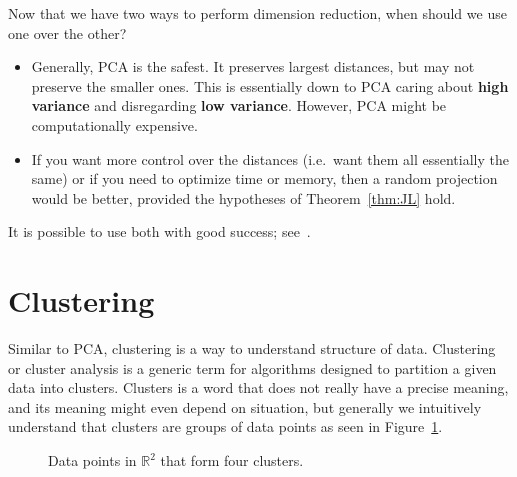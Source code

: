 \documentclass[a4paper, 12pt]{article}
\numberwithin{equation}{section}
\numberwithin{figure}{section}
\theoremstyle{definition}
\newcommand{\R}{\mathbb{R}}
\begin{document}
Now that we have two ways to perform dimension reduction, when should we use one
over the other?
\begin{itemize}
	\item Generally, PCA is the safest. It preserves largest distances, but may
	not preserve the smaller ones. This is essentially down to PCA caring about
	\textbf{high variance} and disregarding \textbf{low variance}. However, PCA
	might be computationally expensive.
	\item If you want more control over the distances (i.e.\ want them all
	essentially the same) or if you need to optimize time or memory, then a
	random projection would be better, provided the hypotheses of
	Theorem~\ref{thm:JL} hold.
\end{itemize}
It is possible to use both with good success; see~\cite{YLDW/21}.





\section{Clustering}

Similar to PCA, clustering is a way to understand structure of data. Clustering
or cluster analysis is a generic term for algorithms designed to partition a
given data into clusters. Clusters is a word that does not really have a precise
meaning, and its meaning might even depend on situation, but generally we
intuitively understand that clusters are groups of data points as seen in
Figure~\ref{fig:clusters}.

\begin{figure}
	\centering 
	\caption{Data points in $\R^2$ that form four clusters.}
	\label{fig:clusters}
\end{figure}
\end{document}
